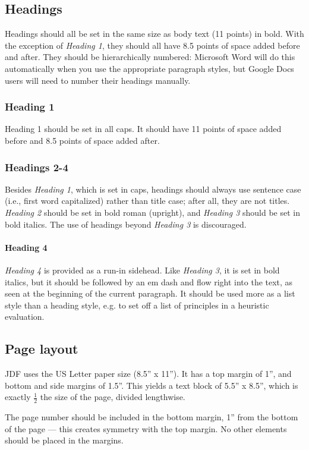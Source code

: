 \subsection{Headings}
Headings should all be set in the same size as body text (11 points) in bold. With the exception of \emph{Heading 1}, they should all have 8.5 points of space added before and after. They should be hierarchically numbered: Microsoft Word will do this automatically when you use the appropriate paragraph styles, but Google Docs users will need to number their headings manually.

\subsubsection{Heading 1}
Heading 1 should be set in all caps. It should have 11 points of space added before and 8.5 points of space added after.

\subsubsection{Headings 2-4}
Besides \emph{Heading 1}, which is set in caps, headings should always use sentence case (i.e., first word capitalized) rather than title case; after all, they are not titles. \emph{Heading 2} should be set in bold roman (upright), and \emph{Heading 3} should be set in bold italics. The use of headings beyond \emph{Heading 3} is discouraged.

\paragraph{Heading 4}
\emph{Heading 4} is provided as a run-in sidehead. Like \emph{Heading 3}, it is set in bold italics, but it should be followed by an em dash and flow right into the text, as seen at the beginning of the current paragraph. It should be used more as a list style than a heading style, e.g. to set off a list of principles in a heuristic evaluation.

\subsection{Page layout}
JDF uses the US Letter paper size (8.5'' x 11''). It has a top margin of 1'', and bottom and side margins of 1.5''. This yields a text block of 5.5'' x 8.5'', which is exactly $\frac{1}{2}$ the size of the page, divided lengthwise.

The page number should be included in the bottom margin, 1'' from the bottom of the page --- this creates symmetry with the top margin. No other elements should be placed in the margins.


